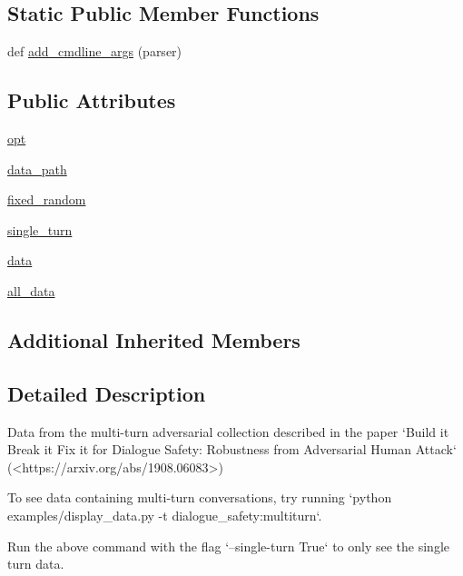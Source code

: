 \subsection*{Static Public Member Functions}
\begin{DoxyCompactItemize}
\item 
def \hyperlink{classparlai_1_1tasks_1_1dialogue__safety_1_1agents_1_1MultiturnTeacher_aa7d5691d1e80f9104f21698b8348b55e}{add\+\_\+cmdline\+\_\+args} (parser)
\end{DoxyCompactItemize}
\subsection*{Public Attributes}
\begin{DoxyCompactItemize}
\item 
\hyperlink{classparlai_1_1tasks_1_1dialogue__safety_1_1agents_1_1MultiturnTeacher_a1e7f1696e4385c96f090de43bbc6333c}{opt}
\item 
\hyperlink{classparlai_1_1tasks_1_1dialogue__safety_1_1agents_1_1MultiturnTeacher_a6ae7a9106d6fbaf0c03f7501975973c6}{data\+\_\+path}
\item 
\hyperlink{classparlai_1_1tasks_1_1dialogue__safety_1_1agents_1_1MultiturnTeacher_a09a1e912d184a8544bfd9b053e05a14d}{fixed\+\_\+random}
\item 
\hyperlink{classparlai_1_1tasks_1_1dialogue__safety_1_1agents_1_1MultiturnTeacher_ae472ac0fed277b530f8e38b33e0eb837}{single\+\_\+turn}
\item 
\hyperlink{classparlai_1_1tasks_1_1dialogue__safety_1_1agents_1_1MultiturnTeacher_ae3535d76dde8df6a43799db8496c1a04}{data}
\item 
\hyperlink{classparlai_1_1tasks_1_1dialogue__safety_1_1agents_1_1MultiturnTeacher_a6a2355fab338fcf40b7eb1b183caa526}{all\+\_\+data}
\end{DoxyCompactItemize}
\subsection*{Additional Inherited Members}


\subsection{Detailed Description}
\begin{DoxyVerb}Data from the multi-turn adversarial collection described in the paper
`Build it Break it Fix it for Dialogue Safety: Robustness from
Adversarial Human Attack` (<https://arxiv.org/abs/1908.06083>)

To see data containing multi-turn conversations, try running
`python examples/display_data.py -t dialogue_safety:multiturn`.

Run the above command with the flag `--single-turn True` to only see the
single turn data.
\end{DoxyVerb}
 

